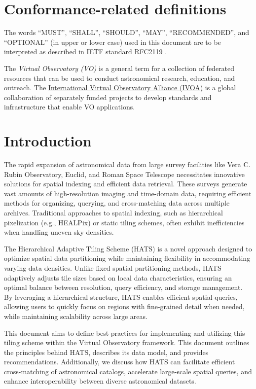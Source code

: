\documentclass[11pt,a4paper]{ivoa}
\begin{document}
\section*{Conformance-related definitions}
The words ``MUST'', ``SHALL'', ``SHOULD'', ``MAY'', ``RECOMMENDED'', and
``OPTIONAL'' (in upper or lower case) used in this document are to be
interpreted as described in IETF standard RFC2119 \citep{std:RFC2119}.

The \emph{Virtual Observatory (VO)} is a
general term for a collection of federated resources that can be used
to conduct astronomical research, education, and outreach.
The \href{https://www.ivoa.net}{International
Virtual Observatory Alliance (IVOA)} is a global
collaboration of separately funded projects to develop standards and
infrastructure that enable VO applications.

\section{Introduction}
The rapid expansion of astronomical data from large survey facilities like Vera C. Rubin Observatory, Euclid, and Roman Space Telescope necessitates innovative solutions for spatial indexing and efficient data retrieval. 
These surveys generate vast amounts of high-resolution imaging and time-domain data, requiring efficient methods for organizing, querying, and cross-matching data across multiple archives. 
Traditional approaches to spatial indexing, such as hierarchical pixelization (e.g., HEALPix) or static tiling schemes, often exhibit inefficiencies when handling uneven sky densities.

The Hierarchical Adaptive Tiling Scheme (HATS) is a novel approach designed to optimize spatial data partitioning while maintaining flexibility in accommodating varying data densities. 
Unlike fixed spatial partitioning methods, HATS adaptively adjusts tile sizes based on local data characteristics, ensuring an optimal balance between resolution, query efficiency, and storage management. 
By leveraging a hierarchical structure, HATS enables efficient spatial queries, allowing users to quickly focus on regions with fine-grained detail when needed, while maintaining scalability across large areas.

This document aims to define best practices for implementing and utilizing this tiling scheme within the Virtual Observatory framework. 
This document outlines the principles behind HATS, describes its data model, and provides recommendations. 
Additionally, we discuss how HATS can facilitate efficient cross-matching of astronomical catalogs, accelerate large-scale spatial queries, and enhance interoperability between diverse astronomical datasets.
\end{document}
